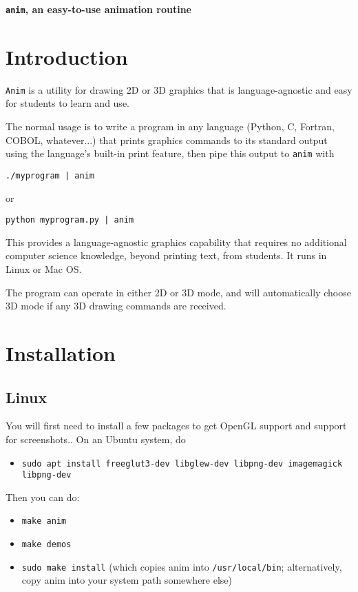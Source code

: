 \documentclass[12pt]{article}
\begin{document}
\centerline{\bf \Huge {\tt anim}, an easy-to-use animation routine}
\bigskip

\section{Introduction}

{\tt Anim} is a utility for drawing 2D or 3D graphics
that is language-agnostic and easy for students to learn and use.

The normal usage is to write a program in any language (Python, C, Fortran,
COBOL, whatever...) that prints graphics commands to its standard output using the
language's built-in print feature, then pipe this output to {\tt anim} with

{\tt ./myprogram | anim}

or

{\tt python myprogram.py | anim}

This provides a language-agnostic graphics capability that requires no additional 
computer science knowledge, beyond printing text, from students. It runs in Linux
or Mac OS.

The program can operate in either 2D or 3D mode, and will automatically choose 3D mode if any 3D drawing commands are received.


\section{Installation}

\subsection{Linux}

You will first need to install a few packages to get OpenGL support and support for screenshots.. On an Ubuntu system, do
\begin{itemize}
  \item {\tt sudo apt install freeglut3-dev libglew-dev libpng-dev imagemagick libpng-dev}
\end{itemize}

Then you can do:

\begin{itemize}
  \item {\tt make anim}
  \item {\tt make demos}
  \item {\tt sudo make install} (which copies anim into {\tt /usr/local/bin}; alternatively, copy anim into your system path somewhere else)
\end{itemize}
\end{document}
